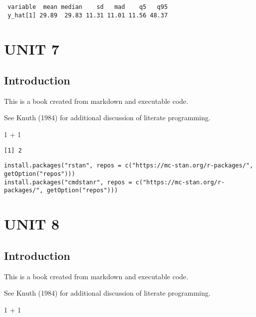 \documentclass[
  letterpaper,
  DIV=11,
  numbers=noendperiod]{scrreprt}
\newenvironment{Shaded}{\begin{snugshade}}{\end{snugshade}}
\newcommand{\DecValTok}[1]{\textcolor[rgb]{0.68,0.00,0.00}{#1}}
\newcommand{\SpecialCharTok}[1]{\textcolor[rgb]{0.37,0.37,0.37}{#1}}
\begin{document}
\begin{verbatim}
 variable  mean median    sd   mad    q5   q95
 y_hat[1] 29.89  29.83 11.31 11.01 11.56 48.37
\end{verbatim}

\part{UNIT 7}

\hypertarget{introduction-4}{%
\chapter{Introduction}\label{introduction-4}}

This is a book created from markdown and executable code.

See Knuth (1984) for additional discussion of literate programming.

\begin{Shaded}
\begin{Highlighting}[]
\DecValTok{1} \SpecialCharTok{+} \DecValTok{1}
\end{Highlighting}
\end{Shaded}

\begin{verbatim}
[1] 2
\end{verbatim}

\begin{verbatim}
install.packages("rstan", repos = c("https://mc-stan.org/r-packages/", getOption("repos")))
install.packages("cmdstanr", repos = c("https://mc-stan.org/r-packages/", getOption("repos")))
\end{verbatim}

\part{UNIT 8}

\hypertarget{introduction-5}{%
\chapter{Introduction}\label{introduction-5}}

This is a book created from markdown and executable code.

See Knuth (1984) for additional discussion of literate programming.

\begin{Shaded}
\begin{Highlighting}[]
\DecValTok{1} \SpecialCharTok{+} \DecValTok{1}
\end{Highlighting}
\end{Shaded}
\end{document}

